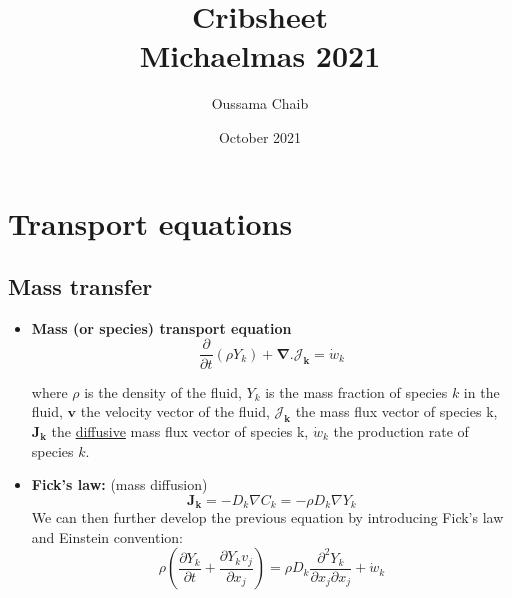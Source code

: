 \documentclass[a4paper,11pt]{article}
\title{%
	Cribsheet \\
	\vspace{10pt}
	\small Michaelmas 2021}
\author{\small Oussama Chaib}
\date{\small October 2021}
\begin{document}
	\maketitle
\section{Transport equations}
\subsection{Mass transfer}
\begin{itemize}
	\item \textbf{Mass (or species) transport equation}
		\[
	\frac{\partial}{\partial t}(\rho Y_k)+\mathbf{\nabla} . \mathbf{\mathcal{J}_k} = \dot{w}_k
	\]
	\begin{center}
	\end{center}


where $\rho$ is the density of the fluid, $Y_k$ is the mass fraction of species $k$ in the fluid, $\mathbf{v}$ the velocity vector of the fluid, $\mathbf{\mathcal{J}_k}$ the mass flux vector of species k,  $\mathbf{J_k}$ the \underline{diffusive} mass flux vector of species k, $\dot{w}_k$ the production rate of species $k$.
\item \textbf{Fick's law:} (mass diffusion)
\[
\mathbf{J_k} = -D_k \nabla C_k = - \rho D_k \nabla Y_k
\]
We can then further develop the previous equation by introducing Fick's law and Einstein convention:
\[
\rho(\frac{\partial Y_k}{\partial t}+\frac{\partial Y_k v_j}{\partial x_j}) = \rho D_k \frac{\partial^2 Y_k}{\partial x_j \partial x_j} + \dot{w}_k
\]
\end{itemize}
\end{document}
